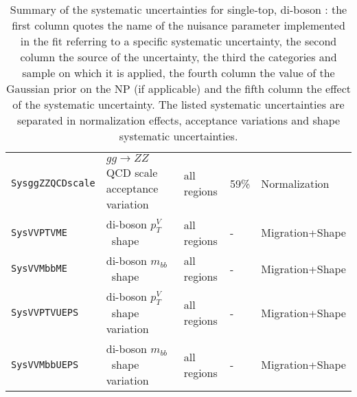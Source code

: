 \begin{table}
{\begin{tabular}{lllll}
      \texttt{SysggZZQCDscale} & $gg\to ZZ$ QCD scale acceptance variation & all regions & 59\% & Normalization\\
      \texttt{SysVVPTVME} & di-boson $p_T^V$\ shape & all regions & - & Migration+Shape \\ 
      \texttt{SysVVMbbME} & di-boson $m_{bb}$\ shape & all regions & - & Migration+Shape \\ 
      \texttt{SysVVPTVUEPS} & di-boson $p_T^V$\ shape variation & all regions & - & Migration+Shape \\
      \texttt{SysVVMbbUEPS} & di-boson $m_{bb}$\ shape variation & all regions & - & Migration+Shape\\
\bottomrule
\end{tabular}
}
\caption[Summary of specific nuisance parameters.]{Summary of the systematic
  uncertainties for single-top, di-boson : the first column quotes the name of
  the nuisance parameter implemented in the fit referring to a specific
  systematic uncertainty, the second column the source of the uncertainty, the
  third the categories and sample on which it is applied, the fourth column the
  value of  the Gaussian prior on the NP (if applicable) and the fifth column
  the effect of the systematic uncertainty. The listed systematic uncertainties
  are separated in normalization effects, acceptance variations  and shape
  systematic uncertainties.}
\label{tab:small_bkg_systematics}
\end{table}
